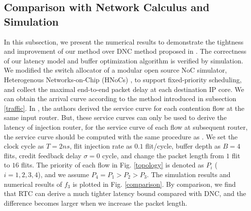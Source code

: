 \documentclass[10pt,journal]{IEEEtran}
\begin{document}
\subsection{Comparison with Network Calculus and Simulation}\label{dnccmp}
In this subsection, we present the numerical results to demonstrate the tightness and improvement of our method over DNC method proposed in \cite{Qian489900}. The correctness of our latency model and buffer optimization algorithm is verified by simulation. We modified the switch allocator of a modular open source NoC simulator, Heterogenous Networks-on-Chip (HNoCs) \cite{6404157}, to support fixed-priority scheduling, and collect the maximal end-to-end packet delay at each destination IP core. We can obtain the arrival curve according to the method introduced in subsection \ref{traffic}. In \cite{Qian489900}, the authors derived the service curve for each contention flow at the same input router. But, these service curves can only be used to derive the latency of injection router, for the service curve of each flow at subsequent router, the service curve should be computed with the same procedure as \cite{qian2009analysis}. We set the clock cycle as $T=2ns$, flit injection rate as $0.1$ flit/cycle, buffer depth as $B=4$ flits, credit feedback delay $\sigma=0$ cycle, and change the packet length from $1$ flit to $16$ flits. The priority of each flow in Fig. \ref{topology} is denoted as $P_i$ ($i=1,2,3,4$), and we assume $P_4=P_1>P_2>P_3$. The simulation results and numerical results of $f_3$ is plotted in Fig. \ref{comparison}. By comparison, we find that RTC can derive a much tighter latency bound compared with DNC, and the difference becomes larger when we increase the packet length.
\end{document}
